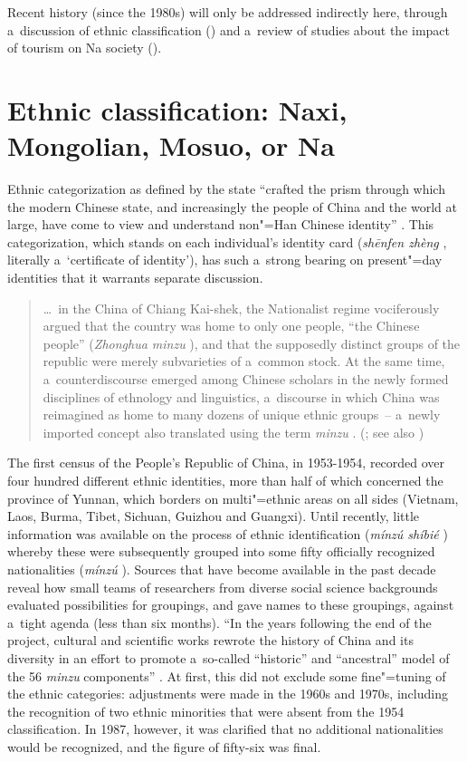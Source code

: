 Recent history (since the 1980s) will only be addressed indirectly here, through a~discussion of ethnic classification () and a~review of studies about the impact of tourism on Na society ().

\section{Ethnic classification: Naxi, Mongolian, Mosuo, or Na}
\label{sec:ethnicclass}

Ethnic categorization as defined by the state “crafted the prism through which the modern Chinese state, and increasingly the people of China and the world at large, have come to view and understand non"=Han Chinese identity” \citep[5]{mullaney2010}. This categorization, which stands on each individual's identity card (\textit{shēnfen zhèng} , literally a~‘certificate of identity’), has such a~strong bearing on present"=day identities that it warrants separate discussion.

\begin{quotation}
	{\dots}~in the China of Chiang Kai-shek, the Nationalist regime vociferously argued that the country was home to only one people, “the Chinese people” (\textit{Zhonghua minzu} ), and that the supposedly distinct groups of the republic were merely subvarieties of a~common stock. At the same time, a~counterdiscourse emerged among Chinese scholars in the newly formed disciplines of ethnology and linguistics, a~discourse in which China was reimagined as home to many dozens of unique ethnic groups~-- a~newly imported concept also translated using the term \textit{minzu} . (\citealt[2]{mullaney2010}; see also \citealt{bulag2012})
\end{quotation}

The first census of the People's Republic of China, in 1953-1954, recorded over four hundred different ethnic identities, more than half of which concerned the province of Yunnan, which borders on multi"=ethnic areas on all sides (Vietnam, Laos, Burma, Tibet, Sichuan, Guizhou and Guangxi). Until recently, little information was available on the process of ethnic identification (\textit{mínzú shíbié} ) whereby these were subsequently grouped into some fifty officially recognized nationalities (\textit{mínzú} ). Sources that have become available in the past decade reveal how small teams of researchers from diverse social science backgrounds evaluated possibilities for groupings, and gave names to these groupings, against a~tight agenda (less than six months). “In the years following the end of the project, cultural and scientific works rewrote the history of China and its
diversity in an effort to promote a~so-called “historic” and “ancestral” model of the 56 \textit{minzu}
components” \citep{frangville2011}. At first, this did not exclude some fine"=tuning of the ethnic categories: adjustments were made in the 1960s and 1970s, including the recognition of two ethnic minorities that were absent from the 1954 classification. In 1987, however, it was clarified that no additional nationalities would be recognized, and the figure of fifty-six was final.

